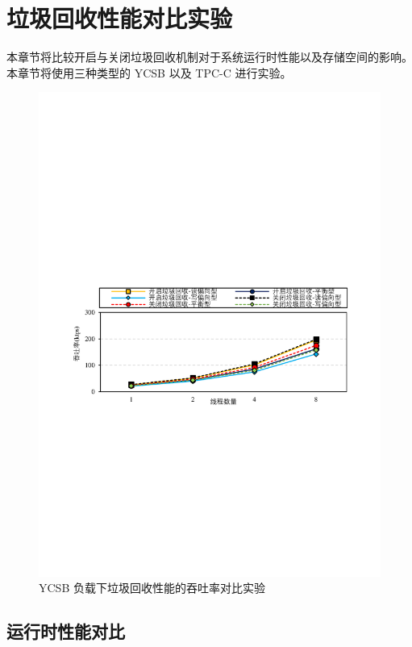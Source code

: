 \section{垃圾回收性能对比实验}

本章节将比较开启与关闭垃圾回收机制对于系统运行时性能以及存储空间的影响。本章节将使用三种类型的 YCSB 以及 TPC-C 进行实验。

\begin{figure}
    \centering
    \includegraphics[width=15cm, trim={1cm 9cm 1cm 10cm}]{figures/gc-ycsb-throughput.pdf}
    \caption{YCSB 负载下垃圾回收性能的吞吐率对比实验}
    \label{fig:gc-throughput-ycsb}
\end{figure}

\subsection{运行时性能对比}

